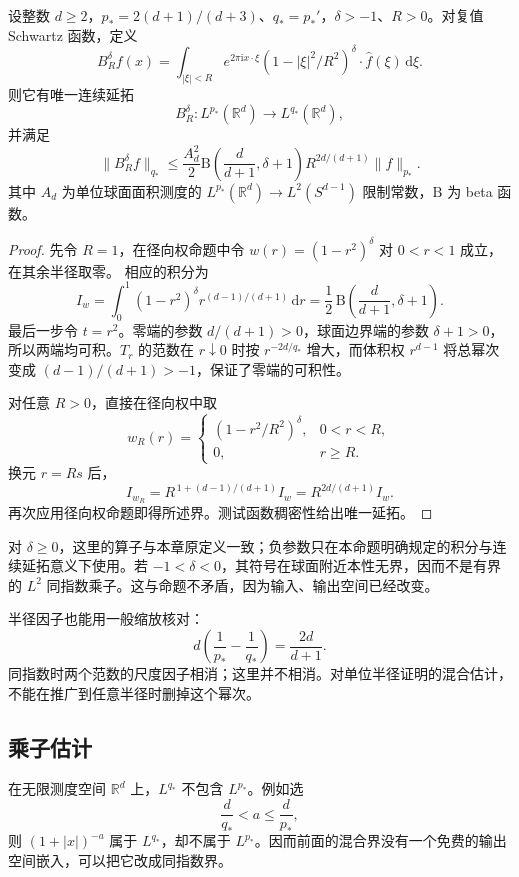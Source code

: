 \begin{proposition}[全平均的混合指数界]\label{b2:prop:24-mixed-bound}
设整数 \(d\geq2\)，\(p_*=2(d+1)/(d+3)\)、\(q_*=p_*'\)，\(\delta>-1\)、\(R>0\)。对复值 Schwartz 函数，定义
\[
 B_R^\delta f(x)
 =\int_{|\xi|<R}e^{2\pi\mathrm i x\cdot\xi}
       (1-|\xi|^2/R^2)^\delta
       \cdot\widehat f(\xi)\,\mathrm d\xi.
\]
则它有唯一连续延拓
\[
 B_R^\delta:L^{p_*}(\mathbb R^d)\longrightarrow L^{q_*}(\mathbb R^d),
\]
并满足
\[
 \|B_R^\delta f\|_{q_*}
 \leq\frac{A_d^2}{2}
       \mathrm B\!\left(\frac d{d+1},\delta+1\right)
       R^{2d/(d+1)}\|f\|_{p_*}.
\]
其中 \(A_d\) 为单位球面面积测度的 \(L^{p_*}(\mathbb R^d)\to L^2(S^{d-1})\) 限制常数，\(\mathrm B\) 为 beta 函数。
\end{proposition}
\begin{proof}
先令 \(R=1\)，在径向权命题中令 \(w(r)=(1-r^2)^\delta\) 对 \(0<r<1\) 成立，在其余半径取零。
相应的积分为
\[
 I_w=\int_0^1(1-r^2)^\delta r^{(d-1)/(d+1)}\,\mathrm dr
 =\frac12\,\mathrm B\!\left(\frac d{d+1},\delta+1\right).
\]
最后一步令 \(t=r^2\)。零端的参数 \(d/(d+1)>0\)，球面边界端的参数 \(\delta+1>0\)，所以两端均可积。\(T_r\) 的范数在 \(r\downarrow0\) 时按 \(r^{-2d/q_*}\) 增大，而体积权 \(r^{d-1}\) 将总幂次变成 \((d-1)/(d+1)>-1\)，保证了零端的可积性。

对任意 \(R>0\)，直接在径向权中取
\[
 w_R(r)=
 \begin{cases}
  (1-r^2/R^2)^\delta,&0<r<R,\\
  0,&r\geq R.
 \end{cases}
\]
换元 \(r=Rs\) 后，
\[
 I_{w_R}=R^{\,1+(d-1)/(d+1)}I_w
        =R^{2d/(d+1)}I_w.
\]
再次应用径向权命题即得所述界。测试函数稠密性给出唯一延拓。
\end{proof}

对 \(\delta\geq0\)，这里的算子与本章原定义一致；负参数只在本命题明确规定的积分与连续延拓意义下使用。若 \(-1<\delta<0\)，其符号在球面附近本性无界，因而不是有界的 \(L^2\) 同指数乘子。这与命题不矛盾，因为输入、输出空间已经改变。

\ProseParagraphBreak
半径因子也能用一般缩放核对：
\[
 d\left(\frac1{p_*}-\frac1{q_*}\right)=\frac{2d}{d+1}.
\]
同指数时两个范数的尺度因子相消；这里并不相消。对单位半径证明的混合估计，不能在推广到任意半径时删掉这个幂次。

\subsection{乘子估计}
\label{b2:subsec:240403}

在无限测度空间 \(\mathbb R^d\) 上，\(L^{q_*}\) 不包含 \(L^{p_*}\)。例如选
\[
 \frac d{q_*}<a\leq\frac d{p_*},
\]
则 \((1+|x|)^{-a}\) 属于 \(L^{q_*}\)，却不属于 \(L^{p_*}\)。因而前面的混合界没有一个免费的输出空间嵌入，可以把它改成同指数界。

